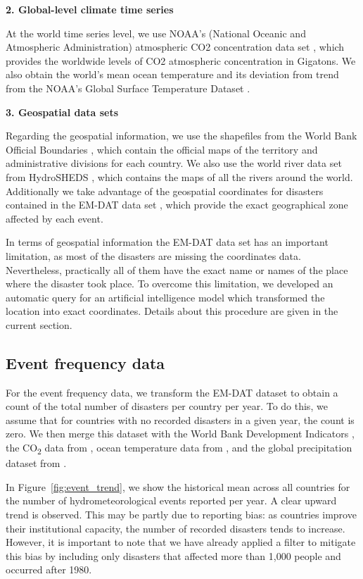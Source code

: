 \textbf{2. Global-level climate time series}

At the world time series level, we use NOAA's (National Oceanic and Atmospheric Administration) atmospheric CO2 concentration data set \citep{noaa_co2_2024}, which provides the worldwide levels of CO2 atmospheric concentration in Gigatons. We also obtain the world's mean ocean temperature and its deviation from trend from the NOAA's Global Surface Temperature Dataset \citep{zhang_noaa_2019}.

\textbf{3. Geospatial data sets}

Regarding the geospatial information, we use the shapefiles from the World Bank Official Boundaries \citep{worldbank_boundaries_2024}, which contain the official maps of the territory and administrative divisions for each country. We also use the world river data set from HydroSHEDS \citep{lehner_global_2013}, which contains the maps of all the rivers around the world.  Additionally we take advantage of the geospatial coordinates for disasters contained in the EM-DAT data set \citep{cred_emdat_2024}, which provide the exact geographical zone affected by each event.

In terms of geospatial information the EM-DAT data set has an important limitation, as most of the disasters are missing the coordinates data. Nevertheless, practically all of them have the exact name or names of the place where the disaster took place. To overcome this limitation, we developed an automatic query for an artificial intelligence model which transformed the location into exact coordinates. Details about this procedure are given in the current section.


\subsection{Event frequency data}

For the event frequency data, we transform the EM-DAT dataset to obtain a count of the total number of disasters per country per year. To do this, we assume that for countries with no recorded disasters in a given year, the count is zero. We then merge this dataset with the World Bank Development Indicators \citep{worldbank_wdi_2024}, the CO\textsubscript{2} data from \citet{noaa_co2_2024}, ocean temperature data from \citet{zhang_noaa_2019}, and the global precipitation dataset from \citet{gpcc_2022}.




In Figure~\ref{fig:event_trend}, we show the historical mean across all countries for the number of hydrometeorological events reported per year. A clear upward trend is observed. This may be partly due to reporting bias: as countries improve their institutional capacity, the number of recorded disasters tends to increase. However, it is important to note that we have already applied a filter to mitigate this bias by including only disasters that affected more than 1,000 people and occurred after 1980.

